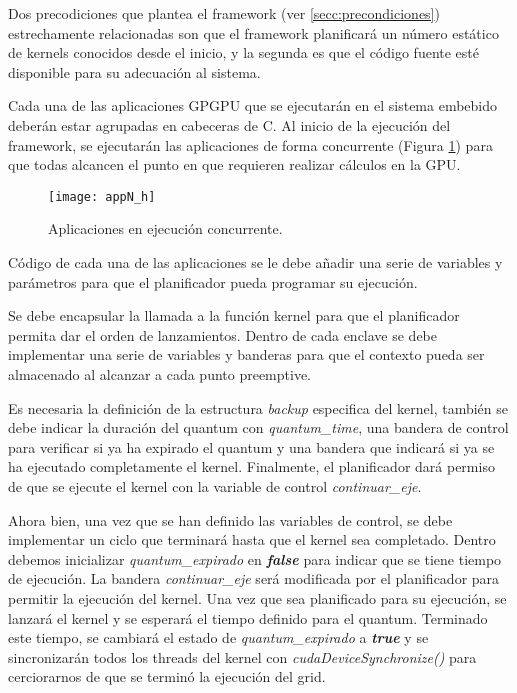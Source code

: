 Dos precodiciones que plantea el framework (ver \ref{secc:precondiciones}) estrechamente relacionadas son que el framework planificará un número estático de kernels conocidos desde el inicio, y la segunda es que el código fuente esté disponible para su adecuación al sistema.
\newline

Cada una de las aplicaciones GPGPU que se ejecutarán en el sistema embebido deberán estar agrupadas en cabeceras de C. Al inicio de la ejecución del framework, se ejecutarán las aplicaciones de forma concurrente (Figura \ref{fig:appN_h}) para que todas alcancen el punto en que requieren realizar cálculos en la GPU.

  \begin{figure}[ht]
      \centering
        \texttt{[image: appN\_h]}
        \caption{Aplicaciones en ejecución concurrente.}
        \label{fig:appN_h}
    \end{figure}

Código de cada una de las aplicaciones se le debe añadir una serie de variables y parámetros para que el planificador pueda programar su ejecución. 
\newline

Se debe encapsular la llamada a la función kernel para que el planificador permita dar el orden de lanzamientos. Dentro de cada enclave se debe implementar una serie de variables y banderas para que el contexto pueda ser almacenado al alcanzar a cada punto preemptive. 
\newline

Es necesaria la definición de la estructura \textit{backup} especifica del kernel, también se debe indicar la duración del quantum con \textit{quantum\_time}, una bandera de control para verificar si ya ha expirado el quantum y una bandera que indicará si ya se ha ejecutado completamente el kernel. Finalmente, el planificador dará permiso de que se ejecute el kernel con la variable de control \textit{continuar\_eje}.

Ahora bien, una vez que se han definido las variables de control, se debe implementar un ciclo que terminará hasta que el kernel sea completado. Dentro debemos inicializar \textit{quantum\_expirado} en \textbf{\textit{false}} para indicar que se tiene tiempo de ejecución. La bandera \textit{continuar\_eje} será modificada por el planificador para permitir la ejecución del kernel. Una vez que sea planificado para su ejecución, se lanzará el kernel  y se esperará el tiempo definido para el quantum. Terminado este tiempo, se cambiará el estado de \textit{quantum\_expirado} a \textit{\textbf{true}} y se sincronizarán todos los threads del kernel con \textit{cudaDeviceSynchronize()} para cerciorarnos de que se terminó la ejecución del grid.
\newline

